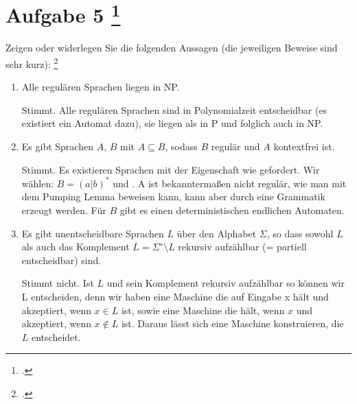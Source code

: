 \documentclass{lehramt-informatik-aufgabe}
\begin{document}
\section{Aufgabe 5
\footcite{66115:2017:03}}

Zeigen oder widerlegen Sie die folgenden Aussagen (die jeweiligen
Beweise sind sehr kurz):
\footcite[Aufgabe 6]{theo:ab:5}

\begin{enumerate}


\item Alle regulären Sprachen liegen in NP.

\begin{liAntwort}
Stimmt. Alle regulären Sprachen sind in Polynomialzeit entscheidbar (es
existiert ein Automat dazu), sie liegen als in P und folglich auch in
NP.
\end{liAntwort}


\item Es gibt Sprachen $A$, $B$ mit $A \subseteq B$, sodass $B$ regulär
und $A$ kontextfrei ist.

\begin{liAntwort}
Stimmt. Es existieren Sprachen mit der Eigenschaft wie gefordert. Wir
wählen: $B = (a|b)^*$ und . A
ist bekanntermaßen nicht regulär, wie man mit dem Pumping Lemma beweisen
kann, kann aber durch eine Grammatik  erzeugt werden. Für $B$ gibt es einen
deterministischen endlichen Automaten.
\end{liAntwort}


\item Es gibt unentscheidbare Sprachen $L$ über den Alphabet $\Sigma$,
so dass sowohl $L$ als auch das Komplement $\overline{L} = \Sigma^∗
\setminus L$ rekursiv aufzählbar (= partiell entscheidbar) sind.

\begin{liAntwort}
Stimmt nicht. Ist $L$ und sein Komplement rekursiv aufzählbar so können
wir L entscheiden, denn wir haben eine Maschine die auf Eingabe x hält
und akzeptiert, wenn $x \in L$ ist, sowie eine Maschine die hält, wenn
$x$ und akzeptiert, wenn $x \notin L$ ist. Daraus lässt sich eine
Maschine konstruieren, die $L$ entscheidet.
\end{liAntwort}


\end{enumerate}
\end{document}
